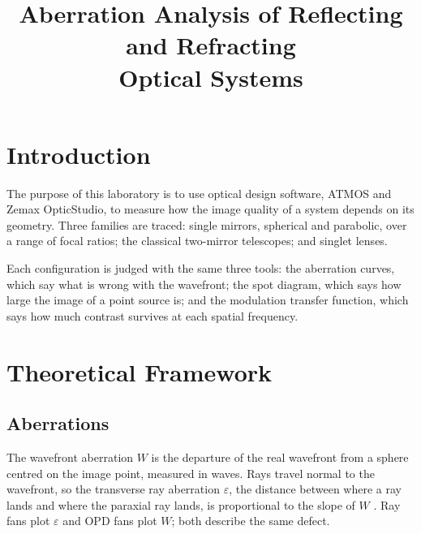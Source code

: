 \documentclass[conference]{IEEEtran}
\begin{document}
\title{Aberration Analysis of Reflecting and Refracting\\
Optical Systems}

\author{
}

\maketitle

\section{Introduction}

The purpose of this laboratory is to use optical design software, ATMOS
\cite{atmos} and Zemax OpticStudio, to measure how the image quality of a
system depends on its geometry. Three families are traced: single mirrors,
spherical and parabolic, over a range of focal ratios; the classical
two-mirror telescopes; and singlet lenses.

Each configuration is judged with the same three tools: the aberration
curves, which say what is wrong with the wavefront; the spot diagram, which
says how large the image of a point source is; and the modulation transfer
function, which says how much contrast survives at each spatial frequency.

\section{Theoretical Framework}
\label{sec:theory}

\subsection{Aberrations}

The wavefront aberration $W$ is the departure of the real wavefront from a
sphere centred on the image point, measured in waves. Rays travel normal to
the wavefront, so the transverse ray aberration $\varepsilon$, the distance
between where a ray lands and where the paraxial ray lands, is proportional to
the slope of $W$ \cite{guide}. Ray fans plot $\varepsilon$ and OPD fans plot
$W$; both describe the same defect.
\end{document}
